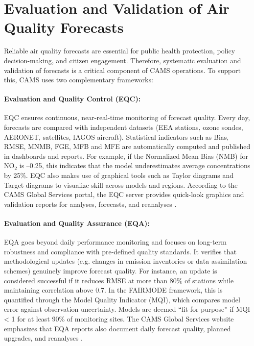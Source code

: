 \section{Evaluation and Validation of Air Quality Forecasts}
\label{sec:evaluation}

Reliable air quality forecasts are essential for public health protection, policy decision-making, and citizen engagement. Therefore, systematic evaluation and validation of forecasts is a critical component of CAMS operations. To support this, CAMS uses two complementary frameworks:

\paragraph{Evaluation and Quality Control (EQC):}
EQC ensures continuous, near-real-time monitoring of forecast quality. Every day, forecasts are compared with independent datasets (EEA stations, ozone sondes, AERONET, satellites, IAGOS aircraft). Statistical indicators such as Bias, RMSE, MNMB, FGE, MFB and MFE are automatically computed and published in dashboards and reports. For example, if the Normalized Mean Bias (NMB) for NO$_2$ is --0.25, this indicates that the model underestimates average concentrations by 25\%. EQC also makes use of graphical tools such as Taylor diagrams and Target diagrams to visualize skill across models and regions. According to the CAMS Global Services portal, the EQC server provides quick-look graphics and validation reports for analyses, forecasts, and reanalyses \cite{copernicusGlobalServices}.

\paragraph{Evaluation and Quality Assurance (EQA):}
EQA goes beyond daily performance monitoring and focuses on long-term robustness and compliance with pre-defined quality standards. It verifies that methodological updates (e.g. changes in emission inventories or data assimilation schemes) genuinely improve forecast quality. For instance, an update is considered successful if it reduces RMSE at more than 80\% of stations while maintaining correlation above 0.7. In the FAIRMODE framework, this is quantified through the Model Quality Indicator (MQI), which compares model error against observation uncertainty. Models are deemed ``fit-for-purpose'' if MQI < 1 for at least 90\% of monitoring sites. The CAMS Global Services website emphasizes that EQA reports also document daily forecast quality, planned upgrades, and reanalyses \cite{copernicusGlobalServices}.


